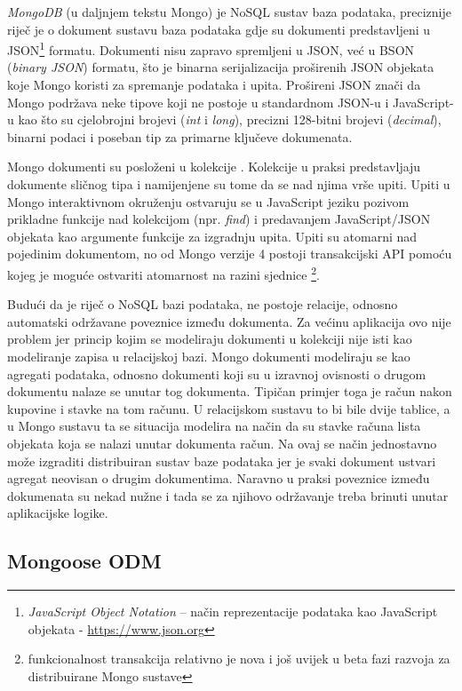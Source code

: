 \documentclass[times, utf8, diplomski, numeric]{fer}
\newcommand{\razmaks}{\vspace{10pt}}
\begin{document}
\emph{MongoDB} (u daljnjem tekstu Mongo) je NoSQL sustav baza podataka, preciznije riječ je o dokument sustavu baza podataka gdje su dokumenti predstavljeni u JSON\footnote{
    \emph{JavaScript Object Notation} – način reprezentacije podataka kao JavaScript objekata - \url{https://www.json.org}
} formatu.
Dokumenti nisu zapravo spremljeni u JSON, već u BSON (\emph{binary JSON}) formatu, što je binarna serijalizacija proširenih JSON objekata koje Mongo koristi za spremanje podataka i upita.
Prošireni JSON znači da Mongo podržava neke tipove koji ne postoje u standardnom JSON-u i JavaScript-u kao što su cjelobrojni brojevi (\emph{int} i \emph{long}), precizni 128-bitni brojevi (\emph{decimal}), binarni podaci i poseban tip za primarne ključeve dokumenata.

Mongo dokumenti su posloženi u kolekcije .
Kolekcije u praksi predstavljaju dokumente sličnog tipa i namijenjene su tome da se nad njima vrše upiti.
Upiti u Mongo interaktivnom okruženju ostvaruju se u JavaScript jeziku pozivom prikladne funkcije nad kolekcijom (npr. \emph{find}) i predavanjem JavaScript/JSON objekata kao argumente funkcije za izgradnju upita. Upiti su atomarni  nad pojedinim dokumentom, no od Mongo verzije 4 postoji transakcijski API pomoću kojeg je moguće ostvariti atomarnost na razini sjednice \footnote{
    funkcionalnost transakcija relativno je nova i još uvijek u beta fazi razvoja za distribuirane Mongo sustave
}\citep{mongo}.

Budući da je riječ o NoSQL bazi podataka, ne postoje relacije, odnosno automatski održavane poveznice između dokumenta.
Za većinu aplikacija ovo nije problem jer princip kojim se modeliraju dokumenti u kolekciji nije isti kao modeliranje zapisa u relacijskoj bazi.
Mongo dokumenti modeliraju se kao agregati podataka, odnosno dokumenti koji su u izravnoj ovisnosti o drugom dokumentu nalaze se unutar tog dokumenta.
Tipičan primjer toga je račun nakon kupovine i stavke na tom računu.
U relacijskom sustavu to bi bile dvije tablice, a u Mongo sustavu ta se situacija modelira na način da su stavke računa lista objekata koja se nalazi unutar dokumenta račun.
Na ovaj se način jednostavno može izgraditi distribuiran sustav baze podataka jer je svaki dokument ustvari agregat neovisan o drugim dokumentima.
Naravno u praksi poveznice između dokumenata su nekad nužne i tada se za njihovo održavanje treba brinuti unutar aplikacijske logike.


\razmaks
\subsection{Mongoose ODM}
\end{document}
